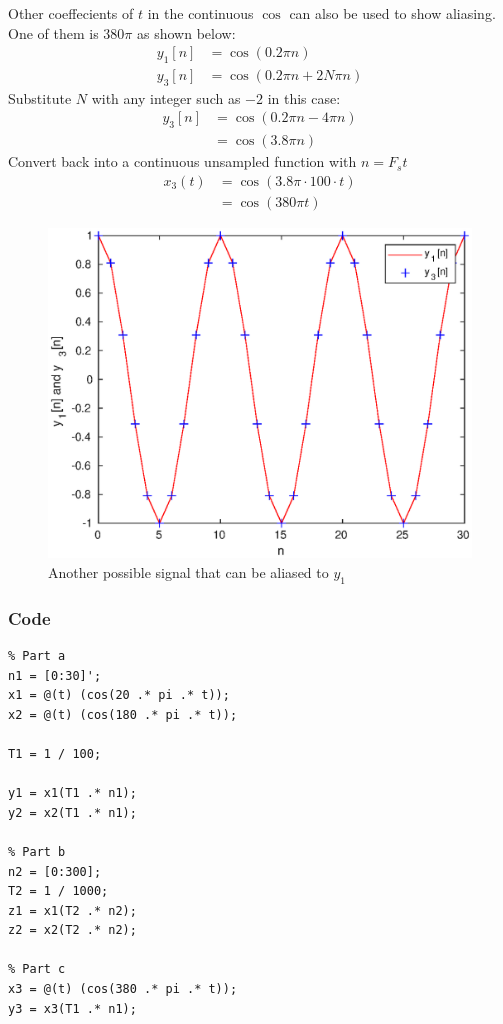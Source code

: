 \documentclass{article}
\begin{document}
\begin{multicols}{2}
    Other coeffecients of \(t\) in the continuous \( \cos \) can also be used to show aliasing. One of them is \( 380\pi \) as shown below:
    \begin{align*}
        y_1[n] & = \cos\left(0.2\pi n\right)             \\
        y_3[n] & = \cos\left(0.2\pi n + 2 N \pi n\right)
    \end{align*}
    Substitute \(N\) with any integer such as \(-2\) in this case:
    \begin{align*}
        y_3[n] & = \cos\left(0.2\pi n -4\pi n\right) \\
               & = \cos\left(3.8 \pi n \right)
    \end{align*}
    Convert back into a continuous unsampled function with \( n = F_s t\)
    \begin{align*}
        x_3(t) & = \cos\left(3.8 \pi \cdot 100 \cdot t \right) \\
               & =\cos\left(380 \pi t \right)
    \end{align*}
    \begin{figure}[H]
        \centering
        \includegraphics[width=\linewidth]{plot6}
        \caption{Another possible signal that can be aliased to \(y_1\)}
    \end{figure}
    \subsubsection{Code}
    \begin{verbatim}
% Part a
n1 = [0:30]';
x1 = @(t) (cos(20 .* pi .* t));
x2 = @(t) (cos(180 .* pi .* t));

T1 = 1 / 100;

y1 = x1(T1 .* n1);
y2 = x2(T1 .* n1);

% Part b
n2 = [0:300];
T2 = 1 / 1000;
z1 = x1(T2 .* n2);
z2 = x2(T2 .* n2);

% Part c
x3 = @(t) (cos(380 .* pi .* t));
y3 = x3(T1 .* n1);
        \end{verbatim}
\end{multicols}
\end{document}
